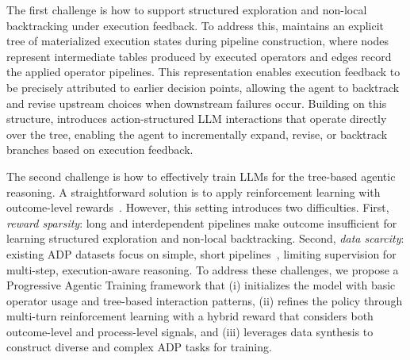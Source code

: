 The first challenge is how to support structured exploration and non-local backtracking under execution feedback.
To address this, \sys maintains an explicit tree of materialized execution states during pipeline construction, where nodes represent intermediate tables produced by executed operators and edges record the applied operator pipelines.
This representation enables execution feedback to be precisely attributed to earlier decision points, allowing the agent to backtrack and revise upstream choices when downstream failures occur.
Building on this structure, \sys introduces action-structured LLM interactions that operate directly over the tree, enabling the agent to incrementally expand, revise, or backtrack branches based on execution feedback.

The second challenge is how to effectively train LLMs for the tree-based agentic reasoning.
A straightforward solution is to apply reinforcement learning with outcome-level rewards~\cite{guo2025deepseek,le2022coderl}.
However, this setting introduces two difficulties.
First, \emph{reward sparsity}: long and interdependent pipelines make outcome insufficient for learning structured exploration and non-local backtracking.
Second, \emph{data scarcity}: existing ADP datasets focus on simple, short pipelines~\cite{DBLP:journals/pvldb/LiHYWC23, lai2025auto}, limiting supervision for multi-step, execution-aware reasoning.
To address these challenges, we propose a Progressive Agentic Training framework that (i) initializes the model with basic operator usage and tree-based interaction patterns, (ii) refines the policy through multi-turn reinforcement learning with a hybrid reward that considers both outcome-level and process-level signals, and (iii) leverages data synthesis to construct diverse and complex ADP tasks for training.


